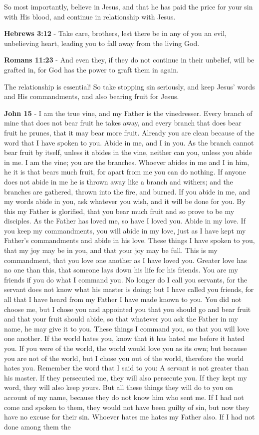 \documentclass[11pt]{article}
\begin{document}
So most importantly, believe in Jesus, and that he has paid the price for your sin with His blood, and continue in relationship with Jesus.

\textbf{Hebrews 3:12} - Take care, brothers, lest there be in any of you an evil, unbelieving heart, leading you to fall away from the living God.

\textbf{Romans 11:23} - And even they, if they do not continue in their unbelief, will be grafted in, for God has the power to graft them in again.

The relationship is essential!
So take stopping sin seriously, and keep Jesus' words and His commandments, and also bearing fruit for Jesus.

\textbf{John 15} - I am the true vine, and my Father is the vinedresser. Every branch of mine that does not bear fruit he takes away, and every branch that does bear fruit he prunes, that it may bear more fruit. Already you are clean because of the word that I have spoken to you. Abide in me, and I in you. As the branch cannot bear fruit by itself, unless it abides in the vine, neither can you, unless you abide in me. I am the vine; you are the branches. Whoever abides in me and I in him, he it is that bears much fruit, for apart from me you can do nothing. If anyone does not abide in me he is thrown away like a branch and withers; and the branches are gathered, thrown into the fire, and burned. If you abide in me, and my words abide in you, ask whatever you wish, and it will be done for you. By this my Father is glorified, that you bear much fruit and so prove to be my disciples. As the Father has loved me, so have I loved you. Abide in my love. If you keep my commandments, you will abide in my love, just as I have kept my Father's commandments and abide in his love. These things I have spoken to you, that my joy may be in you, and that your joy may be full. This is my commandment, that you love one another as I have loved you. Greater love has no one than this, that someone lays down his life for his friends. You are my friends if you do what I command you. No longer do I call you servants, for the servant does not know what his master is doing; but I have called you friends, for all that I have heard from my Father I have made known to you. You did not choose me, but I chose you and appointed you that you should go and bear fruit and that your fruit should abide, so that whatever you ask the Father in my name, he may give it to you. These things I command you, so that you will love one another. If the world hates you, know that it has hated me before it hated you. If you were of the world, the world would love you as its own; but because you are not of the world, but I chose you out of the world, therefore the world hates you. Remember the word that I said to you: A servant is not greater than his master. If they persecuted me, they will also persecute you. If they kept my word, they will also keep yours. But all these things they will do to you on account of my name, because they do not know him who sent me. If I had not come and spoken to them, they would not have been guilty of sin, but now they have no excuse for their sin. Whoever hates me hates my Father also. If I had not done among them the 
\end{document}
